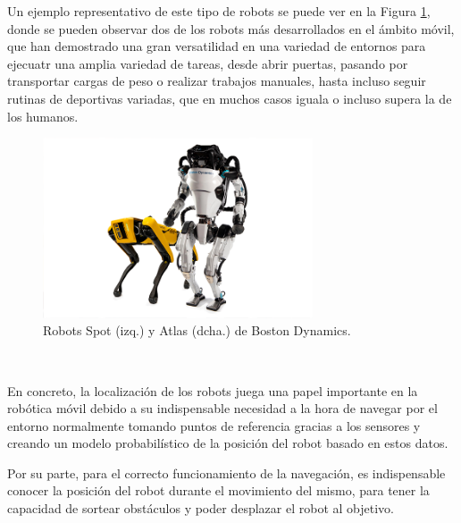 Un ejemplo representativo de este tipo de robots se puede ver en la Figura
\ref{fig:boston_dynamics}, donde se pueden observar dos de los robots más
desarrollados en el ámbito móvil, que han demostrado una gran versatilidad en
una variedad de entornos para ejecuatr una amplia variedad de tareas, desde
abrir puertas, pasando por transportar cargas de peso o realizar trabajos
manuales, hasta incluso seguir rutinas de deportivas variadas, que en muchos
casos iguala o incluso supera la de los humanos.

\begin{figure} [h!]
  \begin{center}
    \includegraphics[width=8cm]{figs/atlas_spot_boston_dynamics}
  \end{center}
  \caption{Robots Spot (izq.) y Atlas (dcha.) de Boston Dynamics.}
  \label{fig:boston_dynamics}
\end{figure}\

En concreto, la localización de los robots juega una papel importante en la
robótica móvil debido a su indispensable necesidad a la hora de navegar por el
entorno normalmente tomando puntos de referencia gracias a los sensores y
creando un modelo probabilístico de la posición del robot basado en estos datos.

Por su parte, para el correcto funcionamiento de la navegación, es indispensable
conocer la posición del robot durante el movimiento del mismo, para tener la
capacidad de sortear obstáculos y poder desplazar el robot al objetivo.

